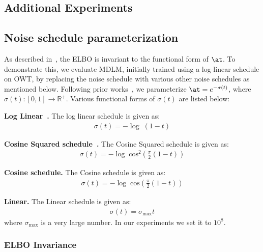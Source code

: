 \documentclass{article} %
\def\algo{MDLM}
\begin{document}
{\begin{appendices}
\section{Additional Experiments}

\subsection{Noise schedule parameterization}\label{sup:subsec:noise_schedule_variance}
As described in~, the ELBO is invariant to the functional form of $\at$. To demonstrate this, we evaluate \algo{}, initially trained using a log-linear schedule on OWT, by replacing the noise schedule with various other noise schedules as mentioned below. Following prior works~\citep{austin2021structured, lou2023discrete, sohl2015deep}, we parameterize $\at = e^{-\sigma(t)}$, where $\sigma(t): [0, 1] \to \mathbb{R}^+$. Various functional forms of $\sigma(t)$ are listed below:

\textbf{Log Linear~\citep{austin2021structured, lou2023discrete, sohl2015deep}.} The log linear schedule is given as:
\begin{align}\label{supp:ns_log_linear}
    \sigma(t) = - \log \; (1- t)
\end{align}

\textbf{Cosine Squared schedule~\citep{han2022ssd}.}
The Cosine Squared schedule is given as:
\begin{align}\label{supp:ns_cosine_squared}
    \sigma(t) = - \log \; \text{cos}^2\left(\frac{\pi}{2}(1 - t)\right)
\end{align}

\textbf{Cosine schedule.}
The Cosine schedule is given as:
\begin{align}\label{supp:ns_cosine}
    \sigma(t) = - \log \; \text{cos}\left(\frac{\pi}{2}(1 - t)\right)
\end{align}

\textbf{Linear.}
The Linear schedule is given as:
\begin{align}\label{supp:ns_linear}
    \sigma(t) = \sigma_{\text{max}} t
\end{align}
where $\sigma_{\text{max}}$ is a very large number. In our experiments we set it to $10^8$.
\subsubsection{ELBO Invariance}\label{supp:subsec:elbo_invariance}


\end{appendices}}
\end{document}
